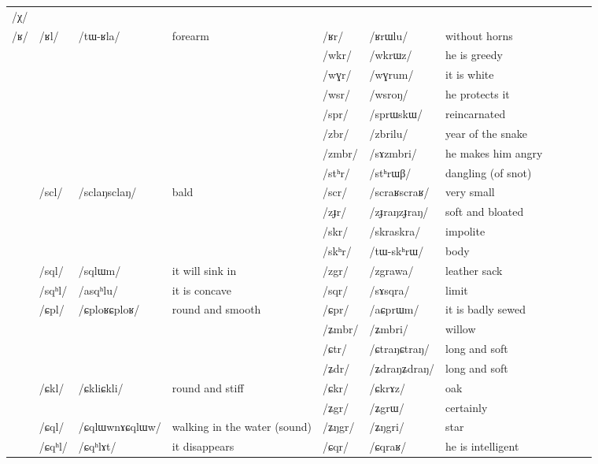 \documentclass[oldfontcommands,oneside,a4paper,11pt]{article}
\newcommand{\ipa}[1]{{\phon/#1/}} %
\newcommand{\deux}[1]{/#1/}
\newcommand{\trois}[1]{/#1/}
\newcommand{\tib}[1]{\cellcolor{lightgray}\textbf{#1}}
\newcommand{\idph}[1]{\cellcolor{gray}\textbf{#1}}
\begin{document}
\begin{table}
{\begin{tabular}{l|lll|lll|lll|l}
\ipa{χ} 	&  	&  	&  	&  	&  	& \\	
\ipa{ʁ} 	& \deux{ʁl} 	& \ipa{tɯ-ʁla} 	& forearm 	& \deux{ʁr} 	& \ipa{ʁrɯlu} 	& without horns\\	
\midrule							
	&	&	&	&\trois{wkr}  \tib{}	& \ipa{wkrɯz}  	&he is greedy \\	
	&	&	&	&\trois{wɣr}  	&\ipa{wɣrum}  	&it is white\\	
	&	&	&  	&\trois{wsr}  	&\ipa{wsroŋ}  	&he protects it\\	
\midrule							
	&	&	&	&\trois{spr}  	& \ipa{sprɯskɯ}  	&  reincarnated\\	
	&	&	&	&\trois{zbr}  \tib{} 	& \ipa{zbrilu}  	& year of the snake \\	
	&	&	&	&\trois{zmbr}  	& \ipa{sɤzmbri}  	& he makes him angry\\	
	&	&	&	&\trois{stʰr}  \idph{} 	& \ipa{stʰrɯβ}  	& dangling (of snot) \\	
	&\trois{scl}  \idph{}	& \ipa{sclaŋsclaŋ}  	& bald	&\trois{scr}  \idph{}	& \ipa{scraʁscraʁ}  	& very small	&\\
	&	&	&	&\trois{zɟr} \idph{} 	& \ipa{zɟraŋzɟraŋ}  	& soft and bloated\\	
	&	&	&	&\trois{skr}  	& \ipa{skraskra}  	& impolite \\	
	&	&	&	&\trois{skʰr}  	& \ipa{tɯ-skʰrɯ}  	& body \\	
	&\trois{sql}  	& \ipa{sqlɯm}  	&it will sink in 	&\trois{zgr} \tib{} 	& \ipa{zgrawa}    	&leather sack\\	
	&\trois{sqʰl}  	& \ipa{asqʰlu}  	&it is concave 	&\trois{sqr}  	& \ipa{sɤsqra}   	&limit\\	
\midrule							
	&\trois{ɕpl}	&\ipa{ɕploʁɕploʁ}	&round and smooth	&\trois{ɕpr}  	& \ipa{aɕprɯm}  	& it is badly sewed\\	
	&	&	&	&\trois{ʑmbr}  	& \ipa{ʑmbri}  	& willow\\	
	&	&	&	&\trois{ɕtr}  \idph{}	& \ipa{ɕtraŋɕtraŋ}  	& long and soft\\	
	&	&	&	&\trois{ʑdr}  \idph{}	& \ipa{ʑdraŋʑdraŋ}  	&  long and soft\\	
	&\trois{ɕkl}	&\ipa{ɕkliɕkli}	&round and stiff	&\trois{ɕkr}  	& \ipa{ɕkrɤz}  	&oak \\	
	&	&	&	&\trois{ʑgr}  	& \ipa{ʑgrɯ}  	&certainly \\	
	&\trois{ɕql}  \idph{}	& \ipa{ɕqlɯwnɤɕqlɯw}  	&  walking in the water (sound)	&\trois{ʑŋgr}  	& \ipa{ʑŋgri}  	&star \\	
	&\trois{ɕqʰl}  	& \ipa{ɕqʰlɤt}  	&it disappears 	&\trois{ɕqr}  	& \ipa{ɕqraʁ}  	& he is intelligent \\	

\end{tabular}}
\end{table}
\end{document}
